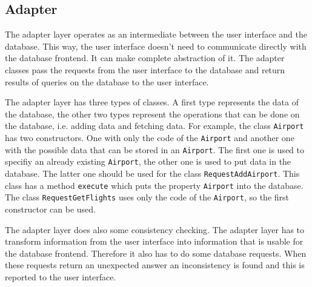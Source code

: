 
\subsection{Adapter}
The adapter layer operates as an intermediate between the user interface and the database. This way, the user interface doesn't need to communicate directly with the database frontend. It can make complete abstraction of it. The adapter classes pass the requests from the user interface to the database and return results of queries on the database to the user interface.

The adapter layer has three types of classes. A first type represents the data of the database, the other two types represent the operations that can be done on the database, i.e. adding data and fetching data. For example, the class \texttt{Airport} has two constructors. One with only the code of the \texttt{Airport} and another one with the possible data that can be stored in an \texttt{Airport}. The first one is used to specifiy an already existing \texttt{Airport}, the other one is used to put data in the database. The latter one should be used for the class \texttt{RequestAddAirport}. This class has a method \texttt{execute} which puts the property \texttt{Airport} into the database. The class \texttt{RequestGetFlights} uses only the code of the \texttt{Airport}, so the first constructor can be used.

The adapter layer does also some consistency checking. The adapter layer has to transform information from the user interface into information that is usable for the database frontend. Therefore it also has to do some database requests. When these requests return an unexpected answer an inconsistency is found and this is reported to the user interface.